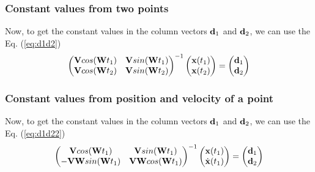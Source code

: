\documentclass[11pt,twoside,a4paper]{article}
\newcommand{\MATRIX}[1]{\mathbf{\uppercase{#1}}}
\newcommand{\VECTOR}[1]{\mathbf{\lowercase{#1}}}
\begin{document}
\subsubsection{Constant values from two points}
Now, to get the constant values in the column vectors $\VECTOR{d}_1$ and $\VECTOR{d}_2$, we can
use the Eq. (\ref{eq:d1d2})
\begin{equation}\label{eq:d1d2}
  \left( 
 \begin{matrix}
\MATRIX{V}cos(\MATRIX{W}t_1) & \MATRIX{V}sin(\MATRIX{W}t_1)\\
\MATRIX{V}cos(\MATRIX{W}t_2) & \MATRIX{V}sin(\MATRIX{W}t_2)\\
 \end{matrix}
 \right)^{-1}
 \left( 
 \begin{matrix}
\VECTOR{X}(t_1) \\
\VECTOR{X}(t_2)
 \end{matrix}
 \right)=
  \left( 
 \begin{matrix}
\VECTOR{d}_1 \\
\VECTOR{d}_2
 \end{matrix}
 \right)
\end{equation}

\subsubsection{Constant values from position and velocity of a point}
Now, to get the constant values in the column vectors $\VECTOR{d}_1$ and $\VECTOR{d}_2$, we can
use the Eq. (\ref{eq:d1d22})
\begin{equation}\label{eq:d1d22}
  \left( 
 \begin{matrix}
\MATRIX{V}cos(\MATRIX{W}t_1) & \MATRIX{V}sin(\MATRIX{W}t_1)\\
-\MATRIX{V}\MATRIX{W}sin(\MATRIX{W}t_1) & \MATRIX{V}\MATRIX{W}cos(\MATRIX{W}t_1)\\
 \end{matrix}
 \right)^{-1}
 \left( 
 \begin{matrix}
\VECTOR{X}(t_1) \\
\dot{\VECTOR{X}}(t_1)
 \end{matrix}
 \right)=
  \left( 
 \begin{matrix}
\VECTOR{d}_1 \\
\VECTOR{d}_2
 \end{matrix}
 \right)
\end{equation}

\end{document}
